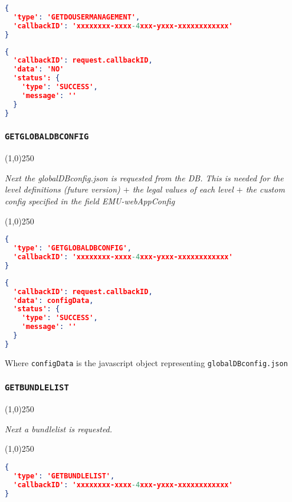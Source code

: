 \documentclass[A4,12pt, utf8]{article}
\begin{document}
\begin{lstlisting}[caption=Request content, language=json]
{
  'type': 'GETDOUSERMANAGEMENT', 
  'callbackID': 'xxxxxxxx-xxxx-4xxx-yxxx-xxxxxxxxxxxx'
}
\end{lstlisting}

\begin{lstlisting}[caption=Reply content, language=json]
{
  'callbackID': request.callbackID,
  'data': 'NO'
  'status': {
    'type': 'SUCCESS',
    'message': ''
  }
}
\end{lstlisting}



\subsubsection{\texttt{GETGLOBALDBCONFIG}}
\begin{center}
  \line(1,0){250}

  \textit{Next the globalDBconfig.json is requested from the DB. This is needed for the level definitions (future version) $+$ the legal values of each level $+$ the custom config specified in the field EMU-webAppConfig}

  \line(1,0){250}
\end{center}


\begin{lstlisting}[caption=Request content, language=json]
{
  'type': 'GETGLOBALDBCONFIG', 
  'callbackID': 'xxxxxxxx-xxxx-4xxx-yxxx-xxxxxxxxxxxx'
}
\end{lstlisting}

\begin{lstlisting}[caption=Reply content, language=json]
{
  'callbackID': request.callbackID,
  'data': configData,
  'status': {
    'type': 'SUCCESS',
    'message': ''
  }
}
\end{lstlisting}
Where \texttt{configData} is the javascript object representing \texttt{globalDBconfig.json}

\subsubsection{\texttt{GETBUNDLELIST}}
\begin{center}
  \line(1,0){250}

  \textit{Next a bundlelist is requested.}

  \line(1,0){250}
\end{center}


\begin{lstlisting}[caption=Request content, language=json]
{
  'type': 'GETBUNDLELIST', 
  'callbackID': 'xxxxxxxx-xxxx-4xxx-yxxx-xxxxxxxxxxxx'
}
\end{lstlisting}
\end{document}
